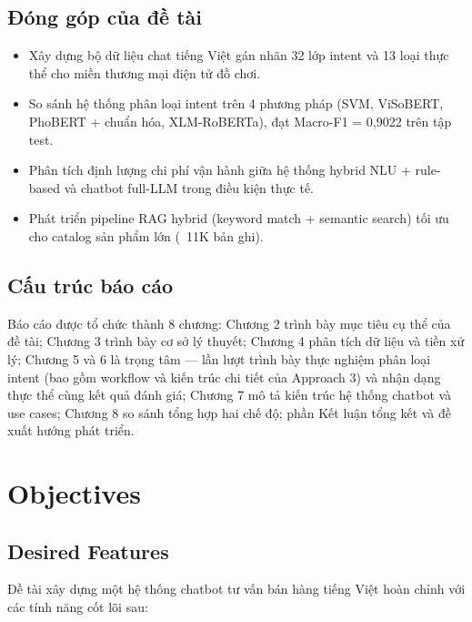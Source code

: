 \documentclass[12pt, a4paper]{report}
\begin{document}
\section{Đóng góp của đề tài}

\begin{itemize}
  \item Xây dựng bộ dữ liệu chat tiếng Việt gán nhãn 32 lớp intent và 13 loại
        thực thể cho miền thương mại điện tử đồ chơi.
  \item So sánh hệ thống phân loại intent trên 4 phương pháp (SVM, ViSoBERT,
        PhoBERT + chuẩn hóa, XLM-RoBERTa), đạt Macro-F1 = 0,9022 trên tập test.
  \item Phân tích định lượng chi phí vận hành giữa hệ thống hybrid NLU + rule-based
        và chatbot full-LLM trong điều kiện thực tế.
  \item Phát triển pipeline RAG hybrid (keyword match + semantic search) tối ưu
        cho catalog sản phẩm lớn (~11K bản ghi).
\end{itemize}

\section{Cấu trúc báo cáo}

Báo cáo được tổ chức thành 8 chương:
Chương 2 trình bày mục tiêu cụ thể của đề tài;
Chương 3 trình bày cơ sở lý thuyết;
Chương 4 phân tích dữ liệu và tiền xử lý;
Chương 5 và 6 là trọng tâm --- lần lượt trình bày thực nghiệm
phân loại intent (bao gồm workflow và kiến trúc chi tiết của Approach 3)
và nhận dạng thực thể cùng kết quả đánh giá;
Chương 7 mô tả kiến trúc hệ thống chatbot và use cases;
Chương 8 so sánh tổng hợp hai chế độ;
phần Kết luận tổng kết và đề xuất hướng phát triển.

\chapter{Objectives}

\section{Desired Features}

Đề tài xây dựng một hệ thống chatbot tư vấn bán hàng tiếng Việt
hoàn chỉnh với các tính năng cốt lõi sau:
\end{document}
